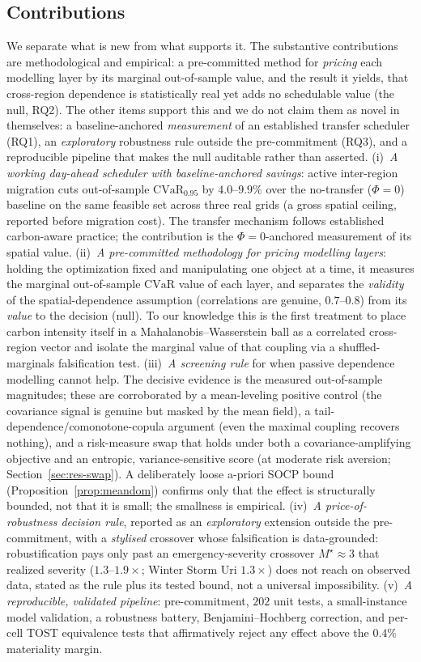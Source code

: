 \documentclass[12pt]{article}
\newcommand{\CVaR}{\mathrm{CVaR}}
\begin{document}
\subsection{Contributions}
We separate what is new from what supports it. The substantive contributions are
methodological and empirical: a pre-committed method for \emph{pricing} each modelling layer
by its marginal out-of-sample value, and the result it yields, that cross-region dependence
is statistically real yet adds no schedulable value (the null, RQ2). The other items support
this and we do not claim them as novel in themselves: a baseline-anchored \emph{measurement}
of an established transfer scheduler (RQ1), an \emph{exploratory} robustness rule outside the
pre-commitment (RQ3), and a reproducible pipeline that makes the null auditable rather than
asserted. (i)~\emph{A working day-ahead
scheduler with baseline-anchored savings}: active inter-region migration cuts
out-of-sample $\CVaR_{0.95}$ by $4.0$--$9.9\%$ over the no-transfer ($\Phi=0$) baseline on
the same feasible set across three real grids (a gross spatial ceiling, reported before
migration cost). The transfer mechanism follows established carbon-aware practice; the
contribution is the $\Phi=0$-anchored measurement of its spatial value. (ii)~\emph{A
pre-committed methodology for pricing modelling layers}: holding the optimization fixed
and manipulating one object at a time, it measures the marginal out-of-sample $\CVaR$
value of each layer, and separates the \emph{validity} of the spatial-dependence
assumption (correlations are genuine, $0.7$--$0.8$) from its \emph{value} to the decision
(null). To our knowledge this is the first treatment to place carbon intensity itself in a
Mahalanobis--Wasserstein ball as a correlated cross-region vector and isolate the marginal
value of that coupling via a shuffled-marginals falsification test. (iii)~\emph{A screening
rule} for when passive dependence modelling cannot help. The decisive evidence is the measured
out-of-sample magnitudes; these are corroborated by a mean-leveling positive control (the
covariance signal is genuine but masked by the mean field), a tail-dependence/comonotone-copula
argument (even the maximal coupling recovers nothing), and a risk-measure swap that holds under
both a covariance-amplifying objective and an entropic, variance-sensitive score (at moderate
risk aversion; Section~\ref{sec:res-swap}). A deliberately loose a-priori SOCP bound
(Proposition~\ref{prop:meandom}) confirms only that the effect is structurally bounded, not
that it is small; the smallness is empirical. (iv)~\emph{A price-of-robustness decision rule}, reported as
an \emph{exploratory} extension outside the pre-commitment, with a \emph{stylised} crossover
whose falsification is data-grounded: robustification pays only past an emergency-severity crossover
$M^\star\approx3$ that realized severity ($1.3$--$1.9\times$; Winter Storm Uri
$1.3\times$) does not reach on observed data, stated as the rule plus its tested bound,
not a universal impossibility. (v)~\emph{A reproducible, validated pipeline}:
pre-commitment, $202$ unit tests, a small-instance model validation, a robustness
battery, Benjamini--Hochberg correction, and per-cell TOST equivalence tests that
affirmatively reject any effect above the $0.4\%$ materiality margin.
\end{document}
